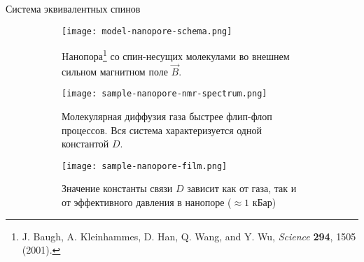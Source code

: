 \begin{frame}{Система эквивалентных спинов}
  \begin{figure}
    \begin{subfigure}[t]{0.32\textwidth}
      \texttt{[image: model-nanopore-schema.png]}
      \caption{
        Hанопора\footnote[frame]{J. Baugh, A. Kleinhammes, D. Han, Q. Wang, and Y. Wu, \textit{Science} \textbf{294}, 1505 (2001).}
        со спин-несущих молекулами во внешнем сильном магнитном поле $\vec B$.
      }
    \end{subfigure}
    \hfill
    \begin{subfigure}[t]{0.32\textwidth}
      \texttt{[image: sample-nanopore-nmr-spectrum.png]}
      \caption{
        Молекулярная диффузия газа быстрее флип-флоп процессов.
        Вся система характеризуется одной константой $D$.
      }
    \end{subfigure}
    \hfill
    \begin{subfigure}[t]{0.32\textwidth}
      \texttt{[image: sample-nanopore-film.png]}
      \caption{
        Значение константы связи $D$ зависит как от газа,
        так и от эффективного давления в нанопоре ($\approx 1$ кБар)
      }
    \end{subfigure}
    \captionsetup{skip=-0.1mm}
    \caption{}
  \end{figure}

%
%
\end{frame}

